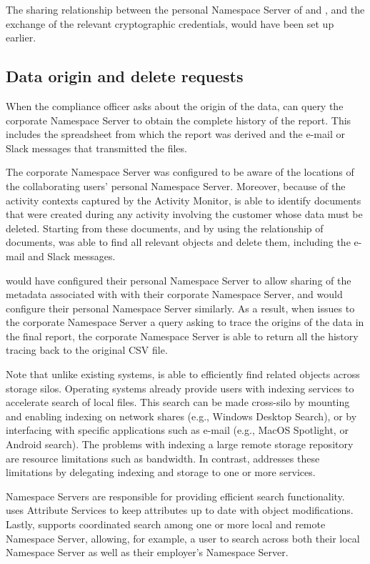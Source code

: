 The sharing relationship between the personal Namespace Server of \persa and \persc, and the
exchange of the relevant cryptographic credentials, would have been set up
earlier.

\subsection{Data origin and delete requests}

When the compliance officer asks about the origin of the data, \persc can query
the corporate Namespace Server to obtain the complete history of the report. This includes the
spreadsheet from which the report was derived and the e-mail or Slack messages
that transmitted the files.

The corporate Namespace Server was configured to be aware of the locations of the
collaborating users' personal Namespace Server. Moreover, because of the activity contexts
captured by the Activity Monitor, \system is able to identify documents that were created
during any activity involving the customer whose data must be deleted. Starting
from these documents, and by using the relationship of documents, \persb was
able to find all relevant objects and delete them, including the e-mail and
Slack messages.

\persa would have configured their personal Namespace Server to allow sharing of the metadata
associated with \persc with their corporate Namespace Server, and \persc would configure their
personal Namespace Server similarly. As a result, when \persc issues to the corporate Namespace Server a
query asking to trace the origins of the data in the final report, the corporate
Namespace Server is able to return all the history tracing back to the original CSV file.

Note that unlike existing systems, \system is able to efficiently find related
objects across storage silos. Operating systems already provide users with
indexing services to accelerate search of local files. This search can be made
cross-silo by mounting and enabling indexing on network shares (e.g., Windows
Desktop Search), or by interfacing with specific applications such as e-mail
(e.g., MacOS Spotlight, or Android search). The problems with indexing a
large remote storage repository are resource limitations such as bandwidth. In contrast,
\system addresses these limitations by delegating indexing and storage to one or
more services.

Namespace Servers are responsible for providing efficient search functionality.
\system uses Attribute Services to keep attributes up to date with object
modifications. Lastly, \system
supports coordinated search among one or more local and remote Namespace Server, allowing, for
example, a user to search across both their local Namespace Server as well as their employer's
Namespace Server.

